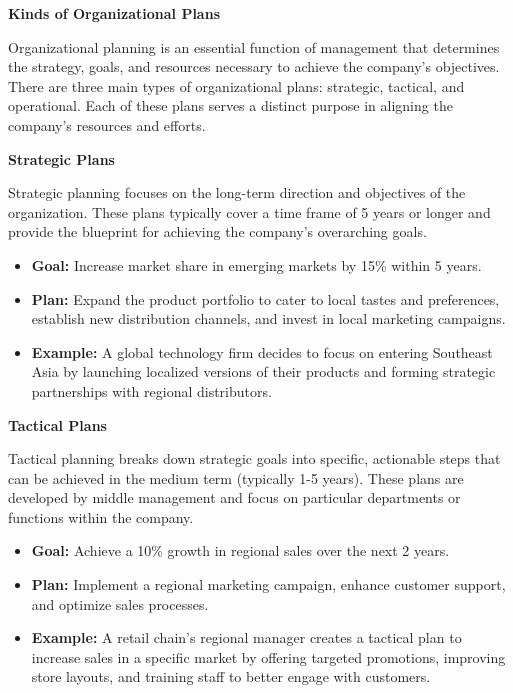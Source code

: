 \documentclass[10pt,a4paper]{book}
\begin{document}
\vspace{0.5cm}

\textbf{Kinds of Organizational Plans}

Organizational planning is an essential function of management that determines the strategy, goals, and resources necessary to achieve the company's objectives. There are three main types of organizational plans: strategic, tactical, and operational. Each of these plans serves a distinct purpose in aligning the company’s resources and efforts.

\vspace{0.5cm}

\textbf{Strategic Plans}

Strategic planning focuses on the long-term direction and objectives of the organization. These plans typically cover a time frame of 5 years or longer and provide the blueprint for achieving the company’s overarching goals.

\begin{itemize}
    \item \textbf{Goal:} Increase market share in emerging markets by 15\% within 5 years.
    \item \textbf{Plan:} Expand the product portfolio to cater to local tastes and preferences, establish new distribution channels, and invest in local marketing campaigns.
    \item \textbf{Example:} A global technology firm decides to focus on entering Southeast Asia by launching localized versions of their products and forming strategic partnerships with regional distributors.
\end{itemize}

\vspace{0.5cm}

\textbf{Tactical Plans}

Tactical planning breaks down strategic goals into specific, actionable steps that can be achieved in the medium term (typically 1-5 years). These plans are developed by middle management and focus on particular departments or functions within the company.

\begin{itemize}
    \item \textbf{Goal:} Achieve a 10\% growth in regional sales over the next 2 years.
    \item \textbf{Plan:} Implement a regional marketing campaign, enhance customer support, and optimize sales processes.
    \item \textbf{Example:} A retail chain's regional manager creates a tactical plan to increase sales in a specific market by offering targeted promotions, improving store layouts, and training staff to better engage with customers.
\end{itemize}
\end{document}
